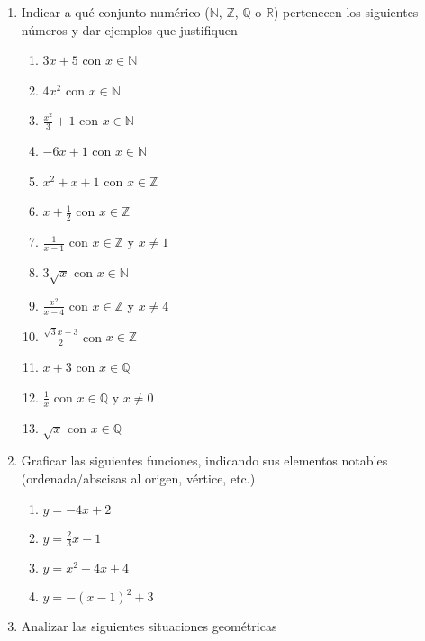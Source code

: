 \documentclass[a4paper]{article}
\newcommand{\exercise}{\item}
\begin{document}
\begin{enumerate}
\begin{enumerate} [label=(\alph*)]
		\item La parábola $\displaystyle\frac{1}{2}x^2-3x+2k$ no tiene raíces reales.
	\end{enumerate}
	\exercise Indicar a qué conjunto numérico ($\mathbb{N}$, $\mathbb{Z}$, $\mathbb{Q}$ o $\mathbb{R}$) pertenecen los siguientes números y dar ejemplos que justifiquen
	\begin{multicols}{2}
	\begin{enumerate} [label=(\alph*)]
		\item $3x+5$ con $x \in \mathbb{N}$
		\item $4x^2$ con $x \in \mathbb{N}$
		\item $\displaystyle\frac{x^2}{3}+1$ con $x \in \mathbb{N}$
		\item $-6x+1$ con $x \in \mathbb{N}$
		\item $x^2+x+1$ con $x \in \mathbb{Z}$
		\item $x+\displaystyle\frac{1}{2}$ con $x \in \mathbb{Z}$
		\item $\displaystyle\frac{1}{x-1}$ con $x \in \mathbb{Z}$ y $x \neq 1$
		\item $3 \sqrt{x}$ con $x \in \mathbb{N}$
		\item $\displaystyle\frac{x^2}{x-4}$ con $x \in \mathbb{Z}$ y $x \neq 4$
		\item $\displaystyle\frac{\sqrt{3}x-3}{2}$ con $x \in \mathbb{Z}$
		\item $x+3$ con $x \in \mathbb{Q}$
		\item $\displaystyle\frac{1}{x}$ con $x \in \mathbb{Q}$ y $x \neq 0$
		\item $\sqrt{x}$ con $x \in \mathbb{Q}$
	\end{enumerate}
	\end{multicols}
	\exercise Graficar las siguientes funciones, indicando sus elementos notables (ordenada/abscisas al origen, vértice, etc.)
	\begin{enumerate} [label=(\alph*)]
		\item $y=-4x+2$
		\item $y=\displaystyle\frac{2}{3}x-1$
		\item $y=x^2+4x+4$
		\item $y=-(x-1)^2+3$
	\end{enumerate}
	\exercise Analizar las siguientes situaciones geométricas

\end{enumerate}
\end{document}
